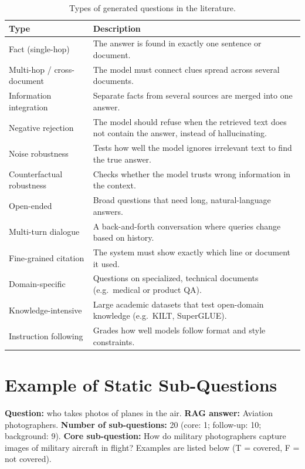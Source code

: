 \documentclass[11pt]{article}
\begin{document}
\begin{table}[H]
\centering\small
\begin{tabularx}{\columnwidth}{@{}p{2.6cm} L@{}}
\toprule
\textbf{Type} & \textbf{Description} \\
\midrule
Fact (single-hop) & The answer is found in exactly one sentence or document. \\
Multi-hop / cross-document & The model must connect clues spread across several documents. \\
Information integration & Separate facts from several sources are merged into one answer. \\
Negative rejection & The model should refuse when the retrieved text does not contain the answer, instead of hallucinating. \\
Noise robustness & Tests how well the model ignores irrelevant text to find the true answer. \\
Counterfactual robustness & Checks whether the model trusts wrong information in the context. \\
Open-ended & Broad questions that need long, natural-language answers. \\
Multi-turn dialogue & A back-and-forth conversation where queries change based on history. \\
Fine-grained citation & The system must show exactly which line or document it used. \\
Domain-specific & Questions on specialized, technical documents (e.g.\ medical or product QA). \\
Knowledge-intensive & Large academic datasets that test open-domain knowledge (e.g.\ KILT, SuperGLUE). \\
Instruction following & Grades how well models follow format and style constraints. \\
\bottomrule
\end{tabularx}
\caption{Types of generated questions in the literature.}
\end{table}

\section{Example of Static Sub-Questions}
\label{app:subq}
\textbf{Question:} who takes photos of planes in the air. \textbf{RAG answer:} Aviation photographers. \textbf{Number of sub-questions:} 20 (core: 1; follow-up: 10; background: 9). \textbf{Core sub-question:} How do military photographers capture images of military aircraft in flight? Examples are listed below (T = covered, F = not covered).
\end{document}
